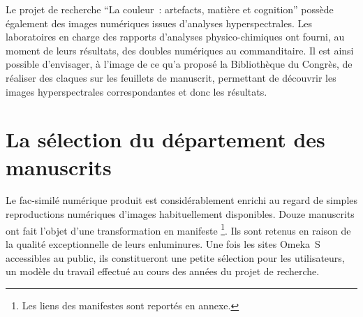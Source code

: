 Le projet de recherche \enquote{La couleur~: artefacts, matière et cognition} possède également des images numériques issues d’analyses hyperspectrales. Les laboratoires en charge des rapports d’analyses physico-chimiques ont fourni, au moment de leurs résultats, des doubles numériques au commanditaire. Il est ainsi possible d’envisager, à l’image de ce qu’a proposé la Bibliothèque du Congrès, de réaliser des claques sur les feuillets de manuscrit, permettant de découvrir les images hyperspectrales correspondantes et donc les résultats.\newpage

\section{La sélection du département des manuscrits}

Le fac-similé numérique produit est considérablement enrichi au regard de simples reproductions numériques d’images habituellement disponibles. Douze manuscrits ont fait l’objet d’une transformation en manifeste \footnote{Les liens des manifestes  sont reportés en annexe.}. Ils sont retenus en raison de la qualité exceptionnelle de leurs enluminures. Une fois les sites Omeka~S accessibles au public, ils constitueront une petite sélection pour les utilisateurs, un modèle du travail effectué au cours des années du projet de recherche.\\\par
